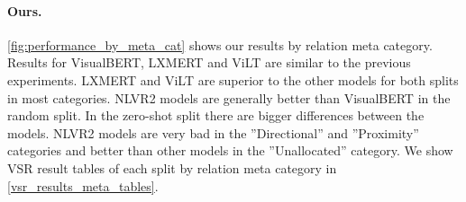 \paragraph{Ours.}

\cref{fig:performance_by_meta_cat} shows our results by relation meta category. Results for VisualBERT, LXMERT and ViLT are similar to the previous experiments. LXMERT and ViLT are superior to the other models for both splits in most categories. NLVR2 models are generally better than VisualBERT in the random split. In the zero-shot split there are bigger differences between the models. NLVR2 models are very bad in the ''Directional'' and ''Proximity'' categories and better than other models in the ''Unallocated'' category. We show VSR result tables of each split by relation meta category in \cref{vsr_results_meta_tables}.
